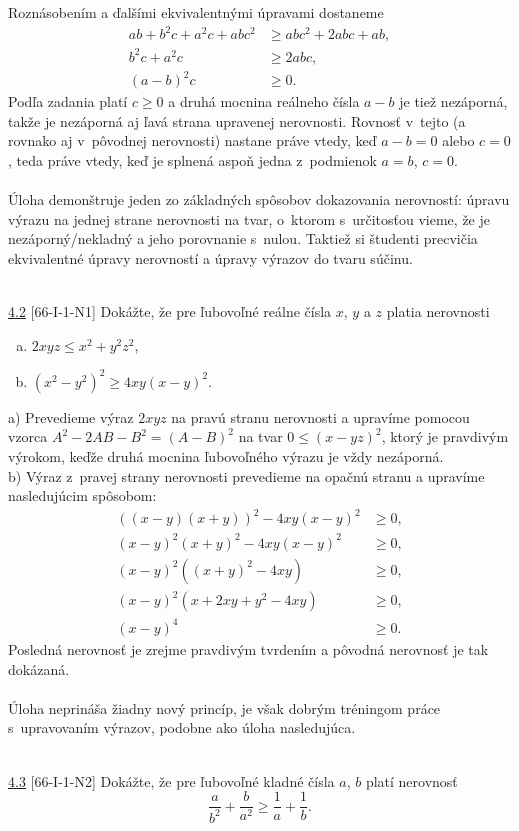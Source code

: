 \rieh Roznásobením a ďalšími ekvivalentnými úpravami dostaneme
\begin{align*}
ab + b^2 c + a^2 c + abc^2 &\geq abc^2 + 2abc + ab,\\
b^2 c + a^2 c &\geq 2abc,\\
(a - b)^2 c &\geq 0.
\end{align*}
Podľa zadania platí $c \geq 0$ a druhá mocnina reálneho čísla $a-b$ je tiež nezáporná, takže je nezáporná aj ľavá strana upravenej nerovnosti. Rovnosť v~tejto (a rovnako aj v~pôvodnej nerovnosti) nastane práve vtedy, keď $a - b = 0$ alebo $c = 0$, teda práve vtedy, keď je splnená aspoň jedna z~podmienok $a = b$, $c = 0$.\\
\\
\kom Úloha demonštruje jeden zo základných spôsobov dokazovania nerovností: úpravu výrazu na jednej strane nerovnosti na tvar, o~ktorom s~určitosťou vieme, že je nezáporný/nekladný a jeho porovnanie s~nulou. Taktiež si študenti precvičia ekvivalentné úpravy nerovností a úpravy výrazov do tvaru súčinu.\\
\\
\begin{tcolorbox}[breakable,notitle,boxrule=0pt,colback=light-gray,colframe=light-gray]\ul{4.2} [66-I-1-N1] Dokážte, že pre ľubovoľné reálne čísla $x$, $y$ a $z$ platia nerovnosti
\begin{enumerate}[a)]
\item $2xyz \leq x^2+ y^2z^2$,
\item $(x^2-y^2)^2\geq 4xy(x - y)^2$.
\end{enumerate}


\end{tcolorbox}

\rie a) Prevedieme výraz $2xyz$ na pravú stranu nerovnosti a upravíme pomocou vzorca $A^2-2AB-B^2=(A-B)^2$ na tvar $0 \leq (x - yz)^2$, ktorý je pravdivým výrokom, keďže druhá mocnina ľubovoľného výrazu je vždy nezáporná.\\

b) Výraz z~pravej strany nerovnosti prevedieme na opačnú stranu a upravíme nasledujúcim spôsobom:
\begin{align*}
((x-y)(x+y))^2-4xy(x-y)^2 &\geq 0,\\
(x-y)^2(x+y)^2-4xy(x-y)^2 &\geq 0,\\
(x-y)^2((x+y)^2-4xy) &\geq 0,\\
(x-y)^2(x+2xy+y^2-4xy) &\geq 0,\\
(x-y)^4 &\geq 0.
\end{align*}
Posledná nerovnosť je zrejme pravdivým tvrdením a pôvodná nerovnosť je tak dokázaná.\\
\\
\kom Úloha neprináša žiadny nový princíp, je však dobrým tréningom práce s~upravovaním výrazov, podobne ako úloha nasledujúca.\\
\\
\begin{tcolorbox}[breakable,notitle,boxrule=0pt,colback=light-gray,colframe=light-gray]\ul{4.3} [66-I-1-N2] Dokážte, že pre ľubovoľné kladné čísla $a$, $b$ platí nerovnosť $$\frac{a}{b^2}+ \frac{b}{a^2}\geq \frac{1}{a} + \frac{1}{b}.$$

\end{tcolorbox}

